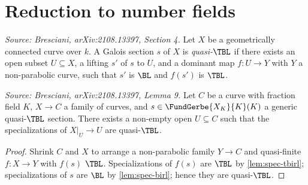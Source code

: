 \section{Reduction to number fields}


\begin{definition}[QuasiTBirat]
  \label{def:quasi-tbirl}
  \textit{Source: Bresciani, arXiv:2108.13397, Section 4.}
  Let \(X\) be a geometrically connected curve over \(k\). A Galois section \(s\) of
  \(X\) is \emph{quasi-\(\TBL\)} if there exists an open subset \(U \subseteq X\),
  a lifting \(s'\) of \(s\) to \(U\), and a dominant map \(f : U \to Y\) with \(Y\)
  a non-parabolic curve, such that \(s'\) is \(\BL\) and \(f(s')\) is \(\TBL\).
\end{definition}

\begin{lemma}[SpecQuasi]
  \label{lem:spec-quasi}
  \textit{Source: Bresciani, arXiv:2108.13397, Lemma 9.}
  Let \(C\) be a curve with fraction field \(K\), \(X \to C\) a family of curves, and
  \(s \in \FundGerbe{X_K}{K}(K)\) a generic quasi-\(\TBL\) section. There exists a
  non-empty open \(U \subseteq C\) such that the specializations of \(X|_U \to U\) are
  quasi-\(\TBL\).
\end{lemma}

\begin{proof}
  Shrink \(C\) and \(X\) to arrange a non-parabolic family \(Y \to C\) and
  quasi-finite \(f : X \to Y\) with \(f(s)\) \(\TBL\). Specializations of \(f(s)\)
  are \(\TBL\) by \cref{lem:spec-tbirl}; specializations of \(s\) are \(\BL\) by
  \cref{lem:spec-birl}; hence they are quasi-\(\TBL\).
\end{proof}

